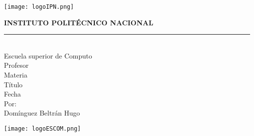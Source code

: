 \documentclass[12pt,a4paper]{article}
\begin{document}
\thispagestyle{empty}
  \AddToShipoutPicture*{\BackgroundPic}
  \noindent
  \begin{minipage}[b]{.15\textwidth}
    \texttt{[image: logoIPN.png]}
  \end{minipage}%
  \begin{minipage}[b]{.7\textwidth}
    \centering
    \large \textbf{INSTITUTO POLITÉCNICO NACIONAL} \\[0.2cm]
    \rule{\textwidth}{1.5pt} \\[0.2cm]
    Escuela superior de Computo \\[5cm]
    Profesor \\[0.5cm]
    Materia \\[0.5cm]
    Título \\[0.5cm]
    Fecha \\[3cm]
    Por: \\
    Domínguez Beltrán Hugo
  \end{minipage}%
  \begin{minipage}[b]{.15\textwidth}
    \texttt{[image: logoESCOM.png]}
  \end{minipage}%
  \vfill
  \clearpage
\end{document}
